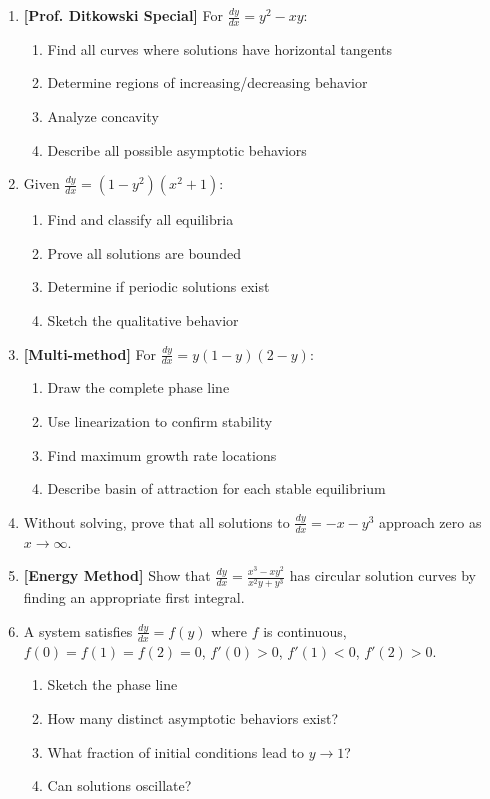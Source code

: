 \documentclass[12pt]{article}
\begin{document}
\begin{enumerate}[resume]
\item \textbf{[Prof. Ditkowski Special]} For $\frac{dy}{dx} = y^2 - xy$:
    \begin{enumerate}[label=\alph*)]
        \item Find all curves where solutions have horizontal tangents
        \item Determine regions of increasing/decreasing behavior
        \item Analyze concavity
        \item Describe all possible asymptotic behaviors
    \end{enumerate}

\item Given $\frac{dy}{dx} = (1-y^2)(x^2 + 1)$:
    \begin{enumerate}[label=\alph*)]
        \item Find and classify all equilibria
        \item Prove all solutions are bounded
        \item Determine if periodic solutions exist
        \item Sketch the qualitative behavior
    \end{enumerate}

\item \textbf{[Multi-method]} For $\frac{dy}{dx} = y(1-y)(2-y)$:
    \begin{enumerate}[label=\alph*)]
        \item Draw the complete phase line
        \item Use linearization to confirm stability
        \item Find maximum growth rate locations
        \item Describe basin of attraction for each stable equilibrium
    \end{enumerate}

\item Without solving, prove that all solutions to $\frac{dy}{dx} = -x - y^3$ approach zero as $x \to \infty$.

\item \textbf{[Energy Method]} Show that $\frac{dy}{dx} = \frac{x^3 - xy^2}{x^2y + y^3}$ has circular solution curves by finding an appropriate first integral.

\item A system satisfies $\frac{dy}{dx} = f(y)$ where $f$ is continuous, $f(0) = f(1) = f(2) = 0$, $f'(0) > 0$, $f'(1) < 0$, $f'(2) > 0$.
    \begin{enumerate}[label=\alph*)]
        \item Sketch the phase line
        \item How many distinct asymptotic behaviors exist?
        \item What fraction of initial conditions lead to $y \to 1$?
        \item Can solutions oscillate?
    \end{enumerate}
\end{enumerate}
\end{document}

